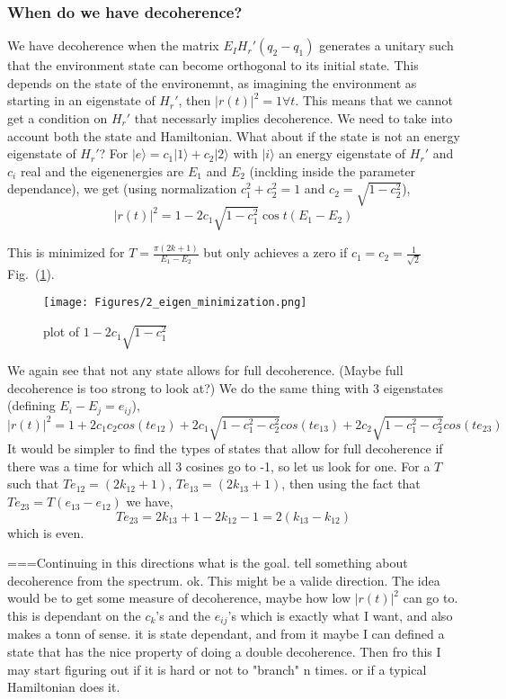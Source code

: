 \documentclass{article}
\begin{document}
\subsubsection{When do we have decoherence?}
We have decoherence when the matrix $E_IH_r'(q_2-q_1)$ generates a unitary such that the environment state can become orthogonal to its initial state. This depends on the state of the environemnt, as imagining the environment as starting in an eigenstate of $H_r'$, then $|r(t)|^2=1\forall t$. This means that we cannot get a condition on $H_r'$ that necessarly implies decoherence. We need to take into account both the state and Hamiltonian. 
What about if the state is not an energy eigenstate of $H_r'$? For $|e\rangle=c_1|1\rangle+c_2|2\rangle$ with $|i\rangle$ an energy eigenstate of $H_r'$ and $c_i$ real and the eigenenergies are $E_1$ and $E_2$ (inclding inside the parameter dependance), we get (using normalization $c_1^2+c_2^2=1$ and $c_2=\sqrt{1-c_2^2}$),
\begin{equation}
    |r(t)|^2=1-2c_1\sqrt{1-c_1^2}\cos{t(E_1-E_2)}
\end{equation}

This is minimized for $T=\frac{\pi (2k+1)}{E_1-E_2}$ but only achieves a zero if $c_1=c_2=\frac{1}{\sqrt{2}}$ Fig.~(\ref{fig:eigen_minim}).
\begin{figure}
    \centering
    \texttt{[image: Figures/2\_eigen\_minimization.png]}
    \caption{plot of $1-2c_1\sqrt{1-c_1^2}$}
    \label{fig:eigen_minim}
\end{figure}

We again see that not any state allows for full decoherence. (Maybe full decoherence is too strong to look at?)
We do the same thing with 3 eigenstates (defining $E_i-E_j=e_{ij}$),
\begin{equation}
    |r(t)|^2=1+2c_1c_2cos(te_{12})+2c_1\sqrt{1-c_1^2-c_2^2}cos(te_{13})+2c_2\sqrt{1-c_1^2-c_2^2}cos(te_{23})
\end{equation}
It would be simpler to find the types of states that allow for full decoherence if there was a time for which all 3 cosines go to -1, so let us look for one. For a $T$ such that $Te_{12}=(2k_{12}+1)$, $Te_{13}=(2k_{13}+1)$, then using the fact that $Te_{23}=T(e_{13}-e_{12})$ we have,
\begin{equation}
    Te_{23}=2k_{13}+1-2k_{12}-1=2(k_{13}-k_{12})
\end{equation}
which is even. 

===Continuing in this directions
what is the goal. tell something about decoherence from the spectrum. ok. This might be a valide direction. The idea would be to get some measure of decoherence, maybe how low $|r(t)|^2$ can go to. this is dependant on the $c_k$'s and the $e_{ij}$'s which is exactly what I want, and also makes a tonn of sense. it is state dependant, and from it maybe I can defined a state that has the nice property of doing a double decoherence. Then fro this I may start figuring out if it is hard or not to "branch" n times. or if a typical Hamiltonian does it.
\end{document}
